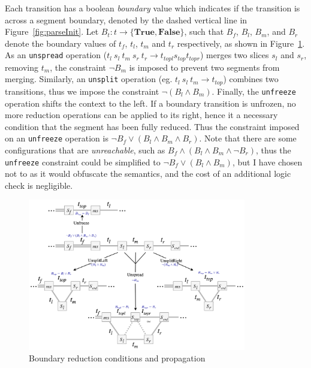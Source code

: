 \documentclass[12pt,a4paper,twoside,openany]{report} \usepackage[pdfborder={0 0 0}]{hyperref}    %
\theoremstyle{definition} \newtheorem{definition}{Definition}[section]
\begin{document}
  Each transition has a boolean \textit{boundary} value which indicates if the transition is across a segment boundary,
  denoted by the dashed vertical line in Figure~\ref{fig:parseInit}. Let $B_t : t \to \{\textbf{True},
  \textbf{False}\}$, such that $B_f$, $B_l$, $B_m$, and $B_r$ denote the boundary values of $t_f$, $t_l$, $t_m$ and
  $t_r$ respectively, as shown in Figure~\ref{fig:parseStateOptions}. As an \texttt{unspread} operation ($t_l~s_l~t_m~s_r~t_r \to t_{topl} s_{top} t_{topr} $) merges
  two slices $s_l$ and $s_r$, removing $t_m$, the constraint $\lnot B_m$ is imposed to prevent two segments from
  merging. Similarly, an \texttt{unsplit} operation (eg. $t_l~s_l~t_m \to t_{top}$) combines two transitions, thus we
  impose the constraint $\lnot (B_l \wedge B_m)$. Finally, the \texttt{unfreeze} operation shifts the context to the
  left. If a boundary transition is unfrozen, no more reduction operations can be applied to its right, hence it
  a necessary condition that the segment has been fully reduced. Thus the constraint imposed on an \texttt{unfreeze}
  operation is $\lnot B_f \vee (B_l \wedge B_m \wedge B_r)$. Note that there are some configurations that are
  \textit{unreachable}, such as $B_f \wedge (B_l \wedge B_m \wedge \lnot B_r)$, thus the \texttt{unfreeze} constraint
  could be simplified to $\lnot B_f \vee (B_l \wedge B_m)$, but I have chosen not to as it would obfuscate the
  semantics, and the cost of an additional logic check is negligible. 

  \begin{figure}[h] \centering \includegraphics[width=0.85\textwidth]{impl/boundarydiagram/diag.png} \caption{Boundary
  reduction conditions and propagation} \label{fig:parseStateOptions} \end{figure}
\end{document}
